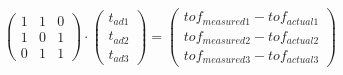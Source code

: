 \begin{equation}
\begin{pmatrix} 1 & 1 & 0 \\ 1 & 0 & 1 \\ 0 & 1 & 1 \end{pmatrix} \cdot \begin{pmatrix} t_{ad1} \\ t_{ad2} \\ t_{ad3} \end{pmatrix} = \begin{pmatrix} tof_{measured1} - tof_{actual1} \\ tof_{measured2} - tof_{actual2} \\ tof_{measured3} - tof_{actual3} \end{pmatrix} \label{eq:antenna_delay_3}
\end{equation}

